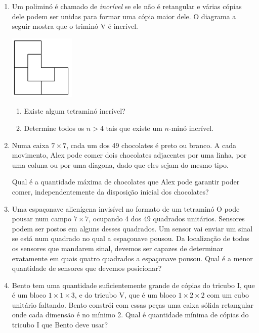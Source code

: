 \documentclass{article}
\begin{document}
\begin{enumerate}
    \item Um poliminó é chamado de \textit{incrível}
    se ele não é retangular e várias cópias dele podem ser unidas para formar uma cópia maior dele.
    O diagrama a seguir mostra que o triminó V é incrível.
    
    \begin{center}
	    \includegraphics[scale=1]{img/img_12_01}
	\end{center}
	
	\begin{enumerate}
	\item Existe algum tetraminó incrível?
	
	\item Determine todos os $n>4$ tais que
	existe um $n$-minó incrível.
	\end{enumerate}
	
	\item Numa caixa $7\times 7$,
	cada um dos 49 chocolates é preto ou branco.
	A cada movimento, Alex pode comer dois chocolates adjacentes por uma linha,
	por uma coluna ou por uma diagona, dado que eles sejam do mesmo tipo.
	
	Qual é a quantidade máxima de chocolates que Alex pode garantir
	poder comer, independentemente da disposição inicial dos chocolates?
	
	\item Uma espaçonave alienígena invisível no formato de um tetraminó O
	pode pousar num campo $7\times 7$,
	ocupando 4 dos 49 quadrados unitários.
	Sensores podem ser postos em alguns desses quadrados.
	Um sensor vai enviar um sinal se está num quadrado no qual a espaçonave pousou.
	Da localização de todos os sensores que mandarem sinal, devemos ser capazes de
	determinar exatamente em quais quatro quadrados a espaçonave pousou.
	Qual é a menor quantidade de sensores que devemos posicionar?
	
	\item Bento tem uma quantidade suficientemente grande de cópias do tricubo I,
	que é um bloco $1\times1\times3$,
	e do tricubo V, que é um bloco $1\times2\times2$ com um cubo unitário faltando.
	Bento constrói com essas peças uma caixa sólida retangular
	onde cada dimensão é no mínimo 2.
	Qual é quantidade mínima de cópias do tricubo I que Bento deve usar?
\end{enumerate}
\end{document}
